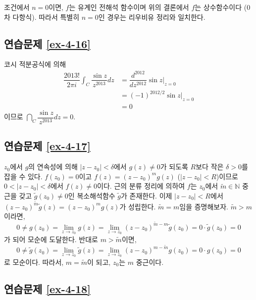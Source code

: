 조건에서 $n=0$이면, $f$는 유계인 전해석 함수이며
위의 결론에서 $f$는 상수함수이다 ($0$차 다항식).
따라서 특별히 $n=0$인 경우는 리우비유 정리와 일치한다.

\subsection*{연습문제 \ref{ex-4-16}}

코시 적분공식에 의해
\begin{align*}
\dfrac{2013!}{2\pi i}  \int_C \dfrac{\sin z}{z^{2013}}dz
&= \dfrac{d^{2012}}{dz^{2012}} \sin z \Big|_{z=0} \\
&= (-1)^{2012/2} \sin z\Big|_{z=0} \\
&=0
\end{align*}
이므로  $ \dint_C \dfrac{\sin z}{z^{2013}}dz=0$.

\subsection*{연습문제 \ref{ex-4-17}}

$z_0$에서 $g$의 연속성에 의해
$|z-z_0|<\delta$에서 $g(z)\ne0$가 되도록 $R$보다 작은 $\delta>0$를 잡을 수 있다.
$f(z_0)=0$이고 $f(z) = (z-z_0)^mg(z)$ ($|z-z_0|<R$)이므로
$0<|z-z_0|<\delta$에서  $f(z)\ne0$이다.
근의 분류 정리에 의하여
$f$는 $z_0$에서 $\tilde m\in \mathbb N$ 중근을 갖고
$\tilde g(z_0)\ne0$인 복소해석함수 $\tilde g$가 존재한다.
이제 $|z-z_0|<R$에서
$(z-z_0)^{\tilde m} \tilde g(z) = (z-z_0)^m g(z)$가 성립한다.
$\tilde m = m$임을 증명해보자.
$\tilde m >m$이라면,
\[
0\ne g(z_0) = \lim_{z\to z_0} g(z) = \lim_{z\to z_0} (z-z_0)^{\tilde m - m}\tilde g(z_0) 
= 0\cdot \tilde g(z_0)= 0
\]
가 되어 모순에 도달한다. 반대로 $m>\tilde m$이면,
\[
0\ne \tilde g(z_0) = \lim_{z\to z_0} \tilde g(z) = \lim_{z\to z_0} (z-z_0)^{m - \tilde m} g(z_0) 
= 0\cdot g(z_0)= 0
\]
로 모순이다.
따라서, $m= \tilde m$이 되고, $z_0$는 $m$ 중근이다.

\subsection*{연습문제 \ref{ex-4-18}}

